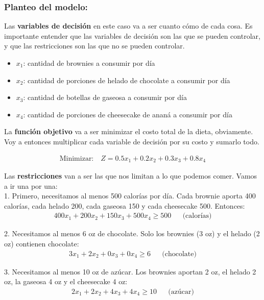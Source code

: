 \documentclass[12pt]{article}
\begin{document}
\subsubsection{Planteo del modelo:}

Las \textbf{variables de decisión} en este caso va a ser cuanto cómo de cada cosa. Es importante entender que las variables de decisión son las que se pueden controlar, y que las restricciones son las que no se pueden controlar.

\begin{itemize}
    \item $x_1$: cantidad de brownies a consumir por día
    \item $x_2$: cantidad de porciones de helado de chocolate a consumir por día
    \item $x_3$: cantidad de botellas de gaseosa a consumir por día
    \item $x_4$: cantidad de porciones de cheesecake de ananá a consumir por día
\end{itemize}

La \textbf{función objetivo} va a ser minimizar el costo total de la dieta, obviamente. Voy a entonces multiplicar cada variable de decisión por su costo y sumarlo todo.

\begin{align*}
    \text{Minimizar:} \quad Z = 0.5x_1 + 0.2x_2 + 0.3x_3 + 0.8x_4
\end{align*}

Las \textbf{restricciones} van a ser las que nos limitan a lo que podemos comer. Vamos a ir una por una: \\

1. Primero, necesitamos al menos 500 calorías por día. Cada brownie aporta 400 calorías, cada helado 200, cada gaseosa 150 y cada cheesecake 500. Entonces:
\begin{align*}
    400x_1 + 200x_2 + 150x_3 + 500x_4 \geq 500 && \text{(calorías)}
\end{align*}

2. Necesitamos al menos 6 oz de chocolate. Solo los brownies (3 oz) y el helado (2 oz) contienen chocolate:
\begin{align*}
    3x_1 + 2x_2 + 0x_3 + 0x_4 \geq 6 && \text{(chocolate)}
\end{align*}

3. Necesitamos al menos 10 oz de azúcar. Los brownies aportan 2 oz, el helado 2 oz, la gaseosa 4 oz y el cheesecake 4 oz:
\begin{align*}
    2x_1 + 2x_2 + 4x_3 + 4x_4 \geq 10 && \text{(azúcar)}
\end{align*}
\end{document}
